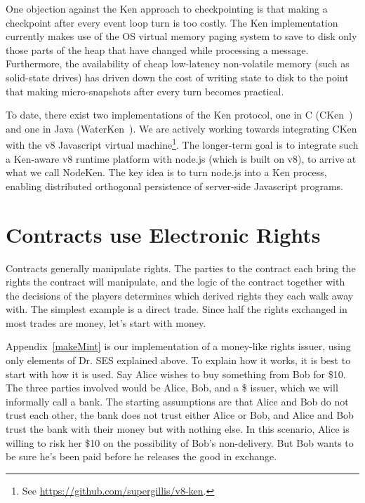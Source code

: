 \documentclass{llncs}
\begin{document}
One objection against the Ken approach to checkpointing is that making a checkpoint after every event loop turn is too costly. The Ken implementation currently makes use of the OS virtual memory paging system to save to disk only those parts of the heap that have changed while processing a message. Furthermore, the availability of cheap low-latency non-volatile memory (such as solid-state drives) has driven down the cost of writing state to disk to the point that making micro-snapshots after every turn becomes practical.

To date, there exist two implementations of the Ken protocol, one in C (CKen~\cite{Yoo:CKen}) and one in Java (WaterKen~\cite{waterken}). We are actively working towards integrating CKen with the v8 Javascript virtual machine\footnote{See \url{https://github.com/supergillis/v8-ken}.}. The longer-term goal is to integrate such a Ken-aware v8 runtime platform with node.js (which is built on v8), to arrive at what we call NodeKen. The key idea is to turn node.js into a Ken process, enabling distributed orthogonal persistence of server-side Javascript programs.


\section{Contracts use Electronic Rights}

Contracts generally manipulate rights. The parties to the contract each bring the rights the contract will manipulate, and the logic of the contract together with the decisions of the players determines which derived rights they each walk away with. The simplest example is a direct trade. Since half the rights exchanged in most trades are money, let's start with money. 

Appendix~\ref{makeMint}  is our implementation of a money-like rights issuer, using only elements of Dr. SES explained above. To explain how it works, it is best to start with how it is used. Say Alice wishes to buy something from Bob for \$10. The three parties involved would be Alice, Bob, and a \$ issuer, which we will informally call a bank. The starting assumptions are that Alice and Bob do not trust each other, the bank does not trust either Alice or Bob, and Alice and Bob trust the bank with their money but with nothing else. In this scenario, Alice is willing to risk her \$10 on the possibility of Bob's non-delivery. But Bob wants to be sure he's been paid before he releases the good in exchange.
\end{document}
